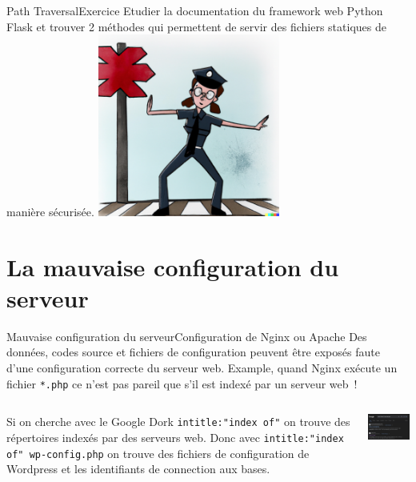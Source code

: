 \documentclass{beamer}
\begin{document}
    \begin{frame}{Path Traversal}{Exercice \execcounterdispinc{}}
        Etudier la documentation du framework web Python Flask et trouver 2 méthodes qui permettent de servir des fichiers statiques de manière sécurisée.
        \bigbreak
        \centering
        \includegraphics[width=6cm]{image/police-blocking-the-road}
    \end{frame}


    \section{La mauvaise configuration du serveur}\label{sec:configuration-serveur}

    \begin{frame}{Mauvaise configuration du serveur}{Configuration de Nginx ou Apache}
        Des données, codes source et fichiers de configuration peuvent être exposés faute d'une configuration correcte du serveur web.
        \bigbreak
        Example, quand Nginx exécute un fichier \lstinline{*.php} ce n'est pas pareil que s'il est indexé par un serveur web~!
        \bigbreak
        \begin{columns}
            \begin{column}{0.6\textwidth}
                Si on cherche avec le Google Dork \lstinline{intitle:"index of"} on trouve des répertoires indexés par des serveurs web.
                Donc avec \lstinline{intitle:"index of" wp-config.php} on trouve des fichiers de configuration de Wordpress et les identifiants de connection aux bases.

            \end{column}
            \begin{column}{0.4\textwidth}
                \centering
                \includegraphics[width=5cm]{image/dork-on-google}
            \end{column}
        \end{columns}
    \end{frame}
\end{document}

